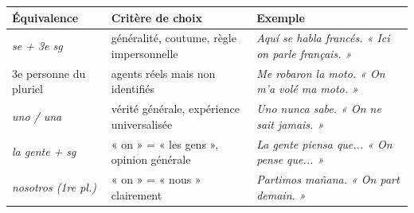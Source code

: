 \documentclass[11pt]{article}
\newcommand{\esp}[1]{\ifmmode\text{\textit{#1}}\else\begingroup\selectlanguage{spanish}\itshape #1\endgroup\fi}
\begin{document}
\begin{aretenir}
\begin{center}
\begin{tabularx}{\linewidth}{|l|X|X|}
\hline
\rowcolor{popblueL} \textbf{Équivalence} & \textbf{Critère de choix} & \textbf{Exemple} \\
\hline
\esp{se} + 3e sg & généralité, coutume, règle impersonnelle & \esp{Aquí se habla francés.} « Ici on parle français. » \\
\hline
3e personne du pluriel & agents réels mais non identifiés & \esp{Me robaron la moto.} « On m'a volé ma moto. » \\
\hline
\esp{uno / una} & vérité générale, expérience universalisée & \esp{Uno nunca sabe.} « On ne sait jamais. » \\
\hline
\esp{la gente} + sg & « on » = « les gens », opinion générale & \esp{La gente piensa que...} « On pense que... » \\
\hline
\esp{nosotros} (1re pl.) & « on » = « nous » clairement & \esp{Partimos mañana.} « On part demain. » \\
\hline
\end{tabularx}
\end{center}
\end{aretenir}
\end{document}
